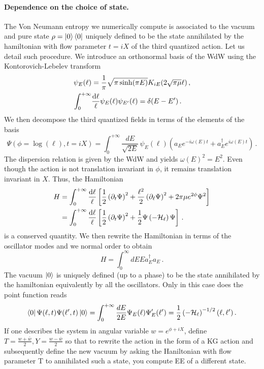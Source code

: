 \documentclass[a4paper]{article}
\begin{document}
\paragraph{Dependence on the choice of state.}
The Von Neumann entropy we numerically compute is associated to the vacuum and pure state $\rho = \ket{0}\bra{0}$ uniquely defined to be the state annihilated by the hamiltonian with flow parameter $t=iX$ of the third quantized action. Let us detail such procedure. We introduce an orthonormal basis of the WdW using the Kontorovich-Lebelev transform
\begin{equation}
  \begin{aligned}
    \psi_E(\ell) &= \frac{1}{\pi}\sqrt{\pi \sinh(\pi E)}K_{iE}(2\sqrt{\pi \mu}\ell)\,,\\
    \int_{0}^{+\infty} &\frac{\rm{d}\ell}{\ell}\psi_E(\ell)\psi_{E'}(\ell) = \delta(E-E')\,.
  \end{aligned}
\end{equation}
We then decompose the third quantized fields in terms of the elements of the basis
\begin{equation}
  \Psi(\phi=\log(\ell),t=iX)=\int_0^{+\infty}\frac{dE}{\sqrt{2E}} \,\psi_E(\ell) \left(a_{E}e^{-i\omega(E) t }+a^{\dagger}_{E}e^{i\omega(E) t }\right)\,.
\end{equation}
The dispersion relation is given by the WdW and yields $\omega(E)^2=E^2$. Even though the action is not translation invariant in $\phi$, it remains translation invariant in $X$. Thus, the Hamiltonian
\begin{equation}
\begin{aligned}
    H &= \int_0^{+\infty} \frac{\rm{d}\ell}{\ell} \left[\frac{1}{2}\left(\partial_t \Psi\right)^2 + \frac{\ell^2}{2}\left(\partial_\ell \Psi\right)^2 + 2\pi \mu e^{2 \phi} \Psi^2\right]\\
    &=\int_0^{+\infty} \frac{\rm{d}\ell}{\ell} \left[\frac{1}{2}\left(\partial_t \Psi\right)^2 + \frac{1}{2}\Psi\left(-\mathcal{H}_\ell \right)\Psi\right]\,.
\end{aligned}
\end{equation}
is a conserved quantity. We then rewrite the Hamiltonian in terms of the oscillator modes and we normal order to obtain
\begin{equation}
  H = \int_0^{\infty} dE E a^{\dagger}_{E} a_{E}\,.
\end{equation}
The vacuum $\ket{0}$ is uniquely defined (up to a phase) to be the state annihilated by the hamiltonian equivalently by all the oscillators. Only in this case does the point function reads
\begin{equation}
  \bra{0}\Psi(\ell,t)\Psi(\ell',t)\ket{0} =\int_0^{+\infty} \frac{dE}{2E} \Psi_E(\ell) \Psi_E'(\ell') = \frac{1}{2}\left(-\mathcal{H}_\ell\right)^{-1/2} (\ell,\ell')\,.
\end{equation}
If one describes the system in angular variable $w=e^{\phi +i X}$, define $T = \frac{w+\bar{w}}{2}, Y = \frac{w - \bar{w}}{2}$ so that to rewrite the action in the form of a KG action and subsequently define the new vacuum by asking the Haniltonian with flow parameter T to annihilated such a state, you compute EE of a different state.
\end{document}
